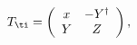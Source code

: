 \begin{equation}
T_{\ti}=\left(
\begin{array}{cc}
x & -Y^{\dagger } \\
Y & Z
\end{array}
\right) ,
\end{equation}

